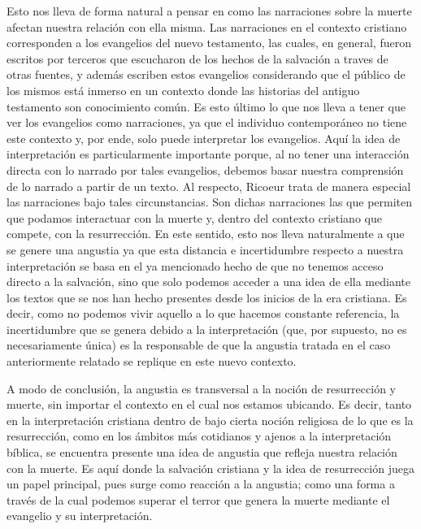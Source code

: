\documentclass{homework}
\begin{document}
Esto nos lleva de forma natural a pensar en como las narraciones sobre la muerte afectan nuestra relación con ella misma. Las narraciones en el contexto cristiano corresponden a los evangelios del nuevo testamento, las cuales, en general, fueron escritos por terceros que escucharon de los hechos de la salvación a traves de otras fuentes, y además escriben estos evangelios considerando que el público de los mismos está inmerso en un contexto donde las historias del antiguo testamento son conocimiento común. Es esto último lo que nos lleva a tener que ver los evangelios como narraciones, ya que el individuo contemporáneo no tiene este contexto y, por ende, solo puede interpretar los evangelios. Aquí la idea de interpretación es particularmente importante porque, al no tener una interacción directa con lo narrado por tales evangelios, debemos basar nuestra comprensión de lo narrado a partir de un texto. Al respecto, Ricoeur trata de manera especial las narraciones bajo tales circunstancias. Son dichas narraciones las que permiten que podamos interactuar con la muerte y, dentro del contexto cristiano que compete, con la resurrección. En este sentido, esto nos lleva naturalmente a que se genere una angustia ya que esta distancia e incertidumbre respecto a nuestra interpretación se basa en el ya mencionado hecho de que no tenemos acceso directo a la salvación, sino que solo podemos acceder a una idea de ella mediante los textos que se nos han hecho presentes desde los inicios de la era cristiana. Es decir, como no podemos vivir aquello a lo que hacemos constante referencia, la incertidumbre que se genera debido a la interpretación (que, por supuesto, no es necesariamente única) es la responsable de que la angustia tratada en el caso anteriormente relatado se replique en este nuevo contexto.

A modo de conclusión, la angustia es transversal a la noción de resurrección y muerte, sin importar el contexto en el cual nos estamos ubicando. Es decir, tanto en la interpretación cristiana dentro de bajo cierta noción religiosa de lo que es la resurrección, como en los ámbitos más cotidianos y ajenos a la interpretación bíblica, se encuentra presente una idea de angustia que refleja nuestra relación con la muerte. Es aquí donde la salvación cristiana y la idea de resurrección juega un papel principal, pues surge como reacción a la angustia; como una forma a través de la cual podemos superar el terror que genera la muerte mediante el evangelio y su interpretación.
\end{document}
